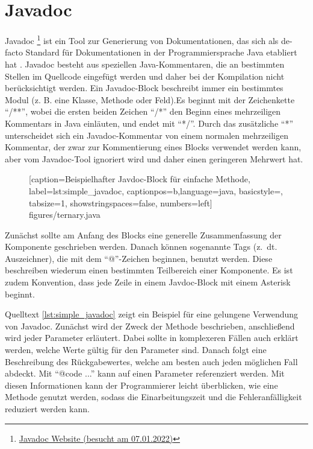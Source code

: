 \section{Javadoc}
Javadoc \footnote{\href{https://www.oracle.com/java/technologies/javase/javadoc-tool.html}{Javadoc Website (besucht am 07.01.2022)} } ist ein Tool zur Generierung von Dokumentationen, das sich als de-facto Standard für Dokumentationen in der Programmiersprache Java etabliert hat \cite[S. 249]{JavadocViolationsandTheirEvolutioninOpen-SourceSoftware}.  Javadoc besteht aus speziellen Java-Kommentaren, die an bestimmten Stellen im Quellcode eingefügt werden und daher bei der Kompilation nicht berücksichtigt werden. Ein Javadoc-Block beschreibt immer ein bestimmtes Modul (z. B. eine Klasse, Methode oder Feld).Es beginnt mit der Zeichenkette \enquote{/**}, wobei die ersten beiden Zeichen \enquote{/*} den Beginn eines mehrzeiligen Kommentars in Java einläuten, und endet mit \enquote{*/}. Durch das zusätzliche \enquote{*} unterscheidet sich ein Javadoc-Kommentar von einem normalen mehrzeiligen Kommentar, der zwar zur Kommentierung eines Blocks verwendet werden kann, aber vom Javadoc-Tool ignoriert wird und daher einen geringeren Mehrwert hat.
		\begin{figure}[ht!]
			
			[caption={Beispielhafter Javdoc-Block für einfache Methode},
			label={lst:simple_javadoc},
			captionpos=b,language=java, basicstyle=\footnotesize, tabsize=1, showstringspaces=false,  numbers=left]
			{figures/ternary.java}
		\end{figure}
Zunächst sollte am Anfang des Blocks eine generelle Zusammenfassung der Komponente geschrieben werden. Danach können sogenannte Tags (z.~dt. Auszeichner), die mit dem \enquote{@}-Zeichen beginnen, benutzt werden. Diese beschreiben wiederum einen bestimmten Teilbereich einer Komponente. Es ist zudem Konvention, dass jede Zeile in einem Javdoc-Block mit einem Asterisk beginnt. 

Quelltext \ref{lst:simple_javadoc} zeigt ein Beispiel für eine gelungene Verwendung von Javadoc. Zunächst wird der Zweck der Methode beschrieben, anschließend wird jeder Parameter erläutert. Dabei sollte in komplexeren Fällen auch erklärt werden, welche Werte gültig für den Parameter sind. Danach folgt eine Beschreibung des Rückgabewertes, welche am besten auch jeden möglichen Fall abdeckt. Mit \enquote{{@code ...}} kann auf einen Parameter referenziert werden. Mit diesen Informationen kann der Programmierer leicht überblicken, wie eine Methode genutzt werden, sodass die Einarbeitungszeit und die Fehleranfälligkeit reduziert werden kann.  



